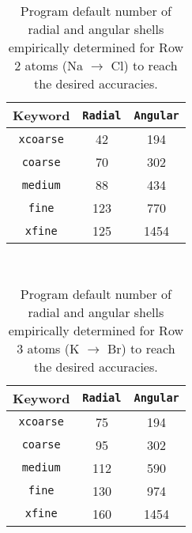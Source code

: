 \begin{table}[h]
\begin{center}
\caption{Program default number of radial and angular shells empirically determined for Row 2 atoms
  (Na $\rightarrow$ Cl) to reach the desired accuracies.}

\vspace{.2in}

  \begin{tabular}[right]{|c|c|c|} \hline
Keyword & {\tt Radial} & {\tt Angular} \\ \hline
{\tt xcoarse} & 42 & 194  \\ \hline
{\tt coarse}  & 70 & 302  \\ \hline
{\tt medium}  & 88 & 434  \\ \hline
{\tt fine}    &123 & 770  \\ \hline
{\tt xfine}   &125 &1454  \\ \hline
  \end{tabular} \\
\end{center}
\end{table}

\begin{table}[h]
\begin{center}
\caption{Program default number of radial and angular shells empirically determined for Row 3 atoms
  (K $\rightarrow$ Br) to reach the desired accuracies.}

\vspace{.2in}

  \begin{tabular}[right]{|c|c|c|} \hline
Keyword & {\tt Radial} & {\tt Angular}  \\ \hline
{\tt xcoarse} & 75 & 194  \\ \hline
{\tt coarse}  & 95 & 302  \\ \hline
{\tt medium}  &112 & 590  \\ \hline
{\tt fine}    &130 & 974  \\ \hline
{\tt xfine}   &160 &1454  \\ \hline
  \end{tabular} \\
\end{center}
\end{table}


